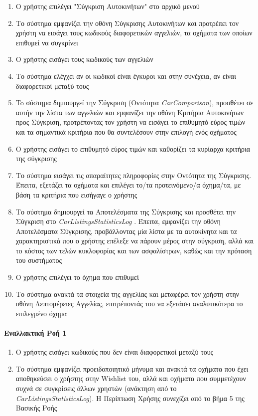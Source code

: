 \documentclass{../ol-softwaremanual}
\begin{document}
	\begin{enumerate}
		\item Ο χρήστης επιλέγει \en"\gr Σύγκριση Αυτοκινήτων\en" \gr στο αρχικό μενού
		\item Το σύστημα εμφανίζει την οθόνη Σύγκρισης Αυτοκινήτων και προτρέπει τον χρήστη να εισάγει τους κωδικούς διαφορετικών αγγελιών, τα οχήματα των οποίων επιθυμεί να συγκρίνει
		\item Ο χρήστης εισάγει τους κωδικούς των αγγελιών
		\item Το σύστημα ελέγχει αν οι κωδικοί είναι έγκυροι και στην συνέχεια, αν είναι διαφορετικοί μεταξύ τους
		\item To σύστημα δημιουργεί την Σύγκριση (Οντότητα \en \textit{CarComparison}\gr), προσθέτει σε αυτήν την λίστα των αγγελιών και εμφανίζει την οθόνη Κριτήρια Αυτοκινήτων προς Σύγκριση, προτρέποντας τον χρήστη να εισάγει το επιθυμητό εύρος τιμών και τα σημαντικά κριτήρια που θα συντελέσουν στην επιλογή ενός οχήματος
		\item Ο χρήστης εισάγει το επιθυμητό εύρος τιμών και καθορίζει τα κυρίαρχα κριτήρια της σύγκρισης
		\item Το σύστημα εισάγει τις απαραίτητες πληροφορίες στην Οντότητα της Σύγκρισης. Έπειτα, εξετάζει τα οχήματα και επιλέγει το/τα προτεινόμενο/α όχημα/τα, με βάση τα κριτήρια που εισήγαγε ο χρήστης
		\item Το σύστημα δημιουργεί τα Αποτελέσματα της Σύγκρισης και προσθέτει την Σύγκριση στο \en \textit{CarListingsStatisticsLog} \gr. Έπειτα, εμφανίζει την οθόνη Αποτελέσματα Σύγκρισης, προβάλλοντας μία λίστα με τα αυτοκίνητα και τα χαρακτηριστικά που ο χρήστης επέλεξε να πάρουν μέρος στην σύγκριση, αλλά και το κόστος των τελών κυκλοφορίας και των ασφαλίστρων, καθώς και την πρόταση του συστήματος 
		\item Ο χρήστης επιλέγει το όχημα που επιθυμεί
		\item Το σύστημα ανακτά τα στοιχεία της αγγελίας και μεταφέρει τον χρήστη στην οθόνη Λεπτομέρειες Αγγελίας, επιτρέποντάς του να εξετάσει αναλυτικότερα το επιλεγμένο όχημα
	\end{enumerate}
	
	\paragraph{Εναλλακτική Ροή 1}
	
	\begin{enumerate}
		\item Ο χρήστης εισάγει κωδικούς που δεν είναι διαφορετικοί μεταξύ τους
		\item Το σύστημα εμφανίζει προειδοποιητικό μήνυμα και ανακτά τα οχήματα που έχει αποθηκεύσει ο χρήστης στην \en Wishlist \gr του, αλλά και οχήματα που συμμετέχουν συχνά σε συγκρίσεις άλλων χρηστών (ανάκτηση από το \en \textit{CarListingsStatisticsLog}\gr). Η Περίπτωση Χρήσης συνεχίζει από το βήμα 5 της Βασικής Ροής
	\end{enumerate}
	
\end{document}

